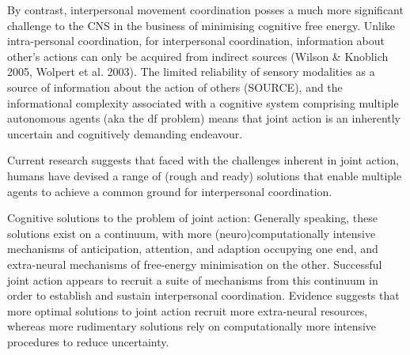\begin{CJK}{UTF8}{gbsn}
By contrast, interpersonal movement coordination posses a much more significant challenge to the CNS in the business of minimising cognitive free energy.  Unlike intra-personal coordination, for interpersonal coordination, information about other’s actions can only be acquired from indirect sources (Wilson & Knoblich 2005, Wolpert et al. 2003).  The limited reliability of sensory modalities as a source of information about the action of others (SOURCE), and the informational complexity associated with a cognitive system comprising multiple autonomous agents (aka the df problem) means that joint action is an inherently uncertain and cognitively demanding endeavour.

Current research suggests that faced with the challenges inherent in joint action,  humans have devised a range of (rough and ready) solutions that enable multiple agents to achieve a common ground for interpersonal coordination.


Cognitive solutions to the problem of joint action:
Generally speaking, these solutions exist on a continuum, with more (neuro)computationally intensive mechanisms of anticipation, attention, and adaption occupying one end, and extra-neural mechanisms of free-energy minimisation on the other.  Successful joint action appears to recruit a suite of mechanisms from this continuum in order to establish and sustain interpersonal coordination.   Evidence suggests that more optimal solutions to joint action recruit more extra-neural resources, whereas more rudimentary solutions rely on computationally more intensive procedures to reduce uncertainty.

\end{CJK}
